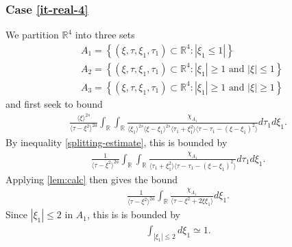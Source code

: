 \documentclass[12pt,reqno]{amsart}
\numberwithin{equation}{section}  %
\numberwithin{figure}{section}
\newcommand{\rr}{\mathbb{R}}
\theoremstyle{plain}
\theoremstyle{definition}
\theoremstyle{remark}
\begin{document}
\subsubsection{Case \eqref{it-real-4}} 
\label{sssec:case-it-real-4}
We partition $\rr^{4}$ into three sets 
%
%
\begin{equation*}
\begin{split}
  & A_{1} = \left\{ (\xi, \tau, \xi_{1}, \tau_{1}) \subset \rr^{4}: |
  \xi_{1} \le 1 | \right \} \\
  & A_{2} = \left\{ (\xi, \tau, \xi_{1}, \tau_{1}) \subset \rr^{4}:|
  \xi_{1} | \ge 1 \text{ and } | \xi| \le 1 \right \}
  \\
  & A_{3} = \left\{ (\xi, \tau, \xi_{1}, \tau_{1}) \subset \rr^{4}:|
  \xi_{1} | \ge 1 \text{ and } | \xi| \ge 1 \right \}
  \end{split}
\end{equation*}
%
%
and first seek to bound
%
%
\begin{equation}
  \label{case-2-region-1}
  \begin{split}
    \frac{ \langle \xi
    \rangle ^{2s}}{\langle \tau - \xi^{2} \rangle ^{2a}}
    \int_{\rr} \int_{\rr} \frac{\chi_{A_{1}}}{ \langle \xi_{1} \rangle ^{2s} \langle \xi-\xi_{1} \rangle ^{2s} 
    \langle \tau_{1} + \xi_{1}^{2} \rangle \langle  \tau - \tau_{1} -
    (\xi - \xi_{1})^{2} \rangle }
    d \tau_1 d \xi_{1}.
  \end{split}
\end{equation}
By inequality \eqref{splitting-estimate}, this is bounded by
%
%
\begin{equation*}
\begin{split}
  \frac{1}{\langle \tau - \xi^{2} \rangle ^{2a}} \int_{\rr} \int_{\rr}
  \frac{\chi_{A_{1}}}{\langle \tau_{1} + \xi_{1}^{2} \rangle  \langle \tau
  - \tau_{1} - ( \xi - \xi_{1})^{2}\rangle } d \tau_{1} d \xi_{1}.
\end{split}
\end{equation*}
%
%
Applying \autoref{lem:calc} then gives the bound
%
%
\begin{equation}
\begin{split}
  \frac{1}{\langle \tau - \xi^{2} \rangle ^{2a}} \int_{\rr}
  \frac{\chi_{A_{1}}}{\langle \tau - \xi^{2} + 2 \xi \xi_{1} \rangle } d
  \xi_{1}.
\end{split}
\label{region-1-case-2-pre-est}
\end{equation}
%
%
Since $| \xi_{1} | \le 2$ in $A_{1}$, this is is bounded by
%
%
\begin{equation*}
\begin{split}
  \int_{| \xi_{1} | \le 2} d \xi_{1} \simeq 1.
\end{split}
\end{equation*}
\end{document}
